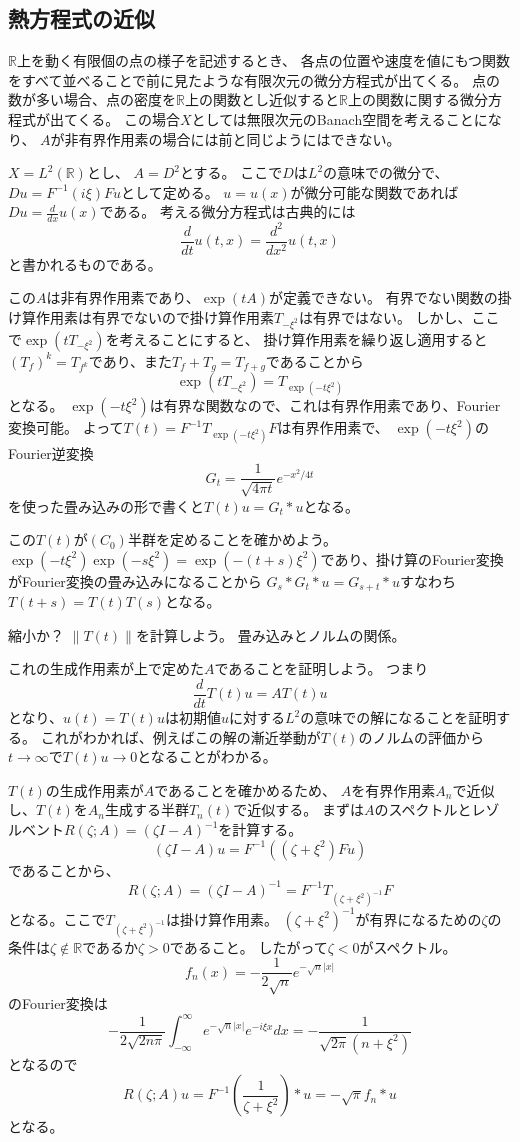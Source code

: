 \documentclass{jsarticle}
\newcommand{\R}{\mathbb{R}}
\newcommand{\abs}[1]{|#1|}
\newcommand{\norm}[1]{\|#1\|}
\begin{document}
\subsection{熱方程式の近似}
$\R$上を動く有限個の点の様子を記述するとき、
各点の位置や速度を値にもつ関数をすべて並べることで前に見たような有限次元の微分方程式が出てくる。
点の数が多い場合、点の密度を$\R$上の関数とし近似すると$\R$上の関数に関する微分方程式が出てくる。
この場合$X$としては無限次元のBanach空間を考えることになり、
$A$が非有界作用素の場合には前と同じようにはできない。

$X=L^2(\R)$とし、 $A=D^2$とする。
ここで$D$は$L^2$の意味での微分で、$Du=F^{-1}(i\xi)Fu$として定める。
$u=u(x)$が微分可能な関数であれば$Du=\frac{d}{dx}u(x)$である。
考える微分方程式は古典的には
\[
\frac{d}{dt}u(t,x)=\frac{d^2}{dx^2}u(t,x)
\]
と書かれるものである。

この$A$は非有界作用素であり、$\exp(tA)$が定義できない。
有界でない関数の掛け算作用素は有界でないので掛け算作用素$T_{-\xi^2}$は有界ではない。
しかし、ここで$\exp(tT_{-\xi^2})$を考えることにすると、
掛け算作用素を繰り返し適用すると$(T_f)^k=T_{f^k}$であり、また$T_f+T_g=T_{f+g}$であることから
\[
\exp(tT_{-\xi^2})=T_{\exp(-t\xi^2)}
\]
となる。
$\exp(-t\xi^2)$は有界な関数なので、これは有界作用素であり、Fourier変換可能。
よって$T(t)=F^{-1}T_{\exp(-t\xi^2)}F$は有界作用素で、
$\exp(-t\xi^2)$のFourier逆変換
\[
G_t=\frac{1}{\sqrt{4\pi t}}e^{-x^2/4t}
\]
を使った畳み込みの形で書くと$T(t)u=G_t*u$となる。

この$T(t)$が$(C_0)$半群を定めることを確かめよう。
$\exp(-t\xi^2)\exp(-s\xi^2)=\exp(-(t+s)\xi^2)$であり、掛け算のFourier変換がFourier変換の畳み込みになることから
$G_s*G_t*u=G_{s+t}*u$すなわち$T(t+s)=T(t)T(s)$となる。

縮小か？
$\norm{T(t)}$を計算しよう。
畳み込みとノルムの関係。

これの生成作用素が上で定めた$A$であることを証明しよう。
つまり
\[
\frac{d}{dt}T(t)u=AT(t)u
\]
となり、$u(t)=T(t)u$は初期値$u$に対する$L^2$の意味での解になることを証明する。
これがわかれば、例えばこの解の漸近挙動が$T(t)$のノルムの評価から$t\to\infty$で$T(t)u\to0$となることがわかる。

$T(t)$の生成作用素が$A$であることを確かめるため、
$A$を有界作用素$A_n$で近似し、$T(t)$を$A_n$生成する半群$T_n(t)$で近似する。
まずは$A$のスペクトルとレゾルベント$R(\zeta;A)=(\zeta I-A)^{-1}$を計算する。
\[
(\zeta I-A)u=F^{-1}((\zeta+\xi^2)Fu)
\]
であることから、
\[
R(\zeta;A)=(\zeta I-A)^{-1}=F^{-1}T_{(\zeta+\xi^2)^{-1}}F
\]
となる。ここで$T_{(\zeta+\xi^2)^{-1}}$は掛け算作用素。
$(\zeta+\xi^2)^{-1}$が有界になるための$\zeta$の条件は$\zeta\not\in\R$であるか$\zeta>0$であること。
したがって$\zeta<0$がスペクトル。
\[
f_n(x)=-\frac{1}{2\sqrt{n}}e^{-\sqrt{n}\abs{x}}
\]
のFourier変換は
\[
-\frac{1}{2\sqrt{2n\pi}}\int^\infty_{-\infty}e^{-\sqrt{n}\abs{x}}e^{-i\xi x}dx=-\frac{1}{\sqrt{2\pi}(n+\xi^2)}
\]
となるので
\[
R(\zeta;A)u=F^{-1}(\frac{1}{\zeta+\xi^2})*u=-\sqrt{\pi}f_n*u
\]
となる。
\end{document}
